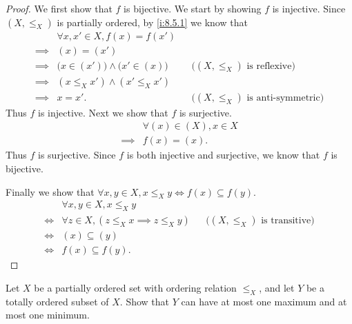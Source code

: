 \begin{proof}
  We first show that \(f\) is bijective.
  We start by showing \(f\) is injective.
  Since \((X, \leq_X)\) is partially ordered, by \cref{i:8.5.1} we know that
  \begin{align*}
             & \forall x, x' \in X, f(x) = f(x')                                                               \\
    \implies & (x) = (x')                                                                                      \\
    \implies & \big(x \in (x')\big) \land \big(x' \in (x)\big) &  & \text{(\((X, \leq_X)\) is reflexive)}      \\
    \implies & (x \leq_X x') \land (x' \leq_X x')                                                              \\
    \implies & x = x'.                                         &  & \text{(\((X, \leq_X)\) is anti-symmetric)}
  \end{align*}
  Thus \(f\) is injective.
  Next we show that \(f\) is surjective.
  \begin{align*}
             & \forall (x) \in (X), x \in X \\
    \implies & f(x) = (x).
  \end{align*}
  Thus \(f\) is surjective.
  Since \(f\) is both injective and surjective, we know that \(f\) is bijective.

  Finally we show that \(\forall x, y \in X, x \leq_X y \iff f(x) \subseteq f(y)\).
  \begin{align*}
         & \forall x, y \in X, x \leq_X y                                                                \\
    \iff & \forall z \in X, (z \leq_X x \implies z \leq_X y) &  & \text{(\((X, \leq_X)\) is transitive)} \\
    \iff & (x) \subseteq (y)                                                                             \\
    \iff & f(x) \subseteq f(y).
  \end{align*}
\end{proof}

\begin{ex}\label{i:ex:8.5.7}
  Let \(X\) be a partially ordered set with ordering relation \(\leq_X\), and let \(Y\) be a totally ordered subset of \(X\).
  Show that \(Y\) can have at most one maximum and at most one minimum.
\end{ex}

